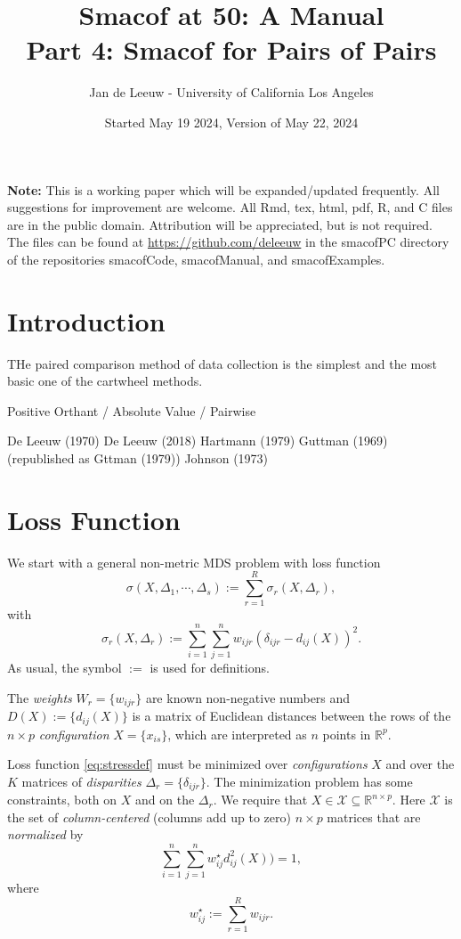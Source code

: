 \documentclass[
  12pt,
]{article}
\title{Smacof at 50: A Manual\\
Part 4: Smacof for Pairs of Pairs}
\author{Jan de Leeuw - University of California Los Angeles}
\date{Started May 19 2024, Version of May 22, 2024}
\newcommand{\sectionbreak}{\clearpage}
\begin{document}
\maketitle

{
\setcounter{tocdepth}{3}
\tableofcontents
}
\textbf{Note:} This is a working paper which will be expanded/updated
frequently. All suggestions for improvement are welcome. All Rmd, tex,
html, pdf, R, and C files are in the public domain. Attribution will be
appreciated, but is not required. The files can be found at
\url{https://github.com/deleeuw} in the smacofPC directory of the
repositories smacofCode, smacofManual, and smacofExamples.

\sectionbreak

\section{Introduction}\label{introduction}

THe paired comparison method of data collection is the simplest and
the most basic one of the cartwheel methods.

Positive Orthant / Absolute Value / Pairwise

De Leeuw (1970)
De Leeuw (2018)
Hartmann (1979)
Guttman (1969) (republished as Gttman (1979))
Johnson (1973)

\section{Loss Function}\label{loss-function}

We start with a general non-metric MDS problem with
loss function
\begin{equation}
\sigma(X,\Delta_1,\cdots,\Delta_s):=\sum_{r=1}^R\sigma_r(X,\Delta_r),
\label{eq:stressdef}
\end{equation}
with
\begin{equation}
\sigma_r(X,\Delta_r):=\sum_{i=1}^n\sum_{j=1}^n w_{ijr}(\delta_{ijr}-d_{ij}(X))^2.
\label{eq:rstressdef}
\end{equation}
As usual, the symbol \(:=\) is used for definitions.

The \emph{weights} \(W_r=\{w_{ijr}\}\) are known non-negative
numbers and \(D(X):=\{d_{ij}(X)\}\) is a matrix of Euclidean distances
between the rows of the \(n\times p\) \emph{configuration} \(X=\{x_{is}\}\), which are interpreted as \(n\) points in \(\mathbb{R}^p\).

Loss function \eqref{eq:stressdef} must be minimized over \emph{configurations} \(X\) and over the \(K\) matrices of \emph{disparities} \(\Delta_r=\{\delta_{ijr}\}\). The minimization problem has some constraints, both on \(X\) and on the \(\Delta_r\).
We require that \(X\in\mathcal{X}\subseteq\mathbb{R}^{n\times p}\). Here \(\mathcal{X}\) is the set of \emph{column-centered} (columns add up to zero) \(n\times p\) matrices that are \emph{normalized} by
\begin{equation}
\sum_{i=1}^n\sum_{j=1}^n w_{ij}^\star d_{ij}^2(X))=1,
\label{eq:xscale}
\end{equation}
where
\begin{equation}
w_{ij}^\star:=\sum_{r=1}^R w_{ijr}.
\label{eq:wstardef}
\end{equation}
\end{document}
